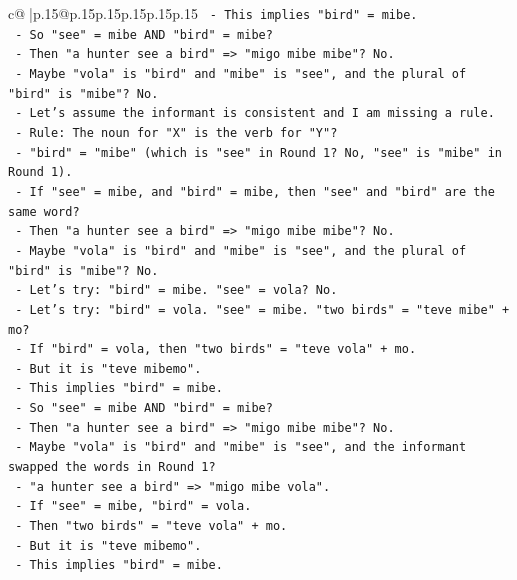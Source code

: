\documentclass{article}
\begin{document}
{\begin{supertabular}{c@{$\;$}|p{.15\linewidth}@{}p{.15\linewidth}p{.15\linewidth}p{.15\linewidth}p{.15\linewidth}p{.15\linewidth}}
{{{\texttt{        {-} This implies "bird" = mibe.} \\
\texttt{        {-} So "see" = mibe AND "bird" = mibe?} \\
\texttt{        {-} Then "a hunter see a bird" => "migo mibe mibe"? No.} \\
\texttt{        {-} Maybe "vola" is "bird" and "mibe" is "see", and the plural of "bird" is "mibe"? No.} \\
\texttt{        {-} Let's assume the informant is consistent and I am missing a rule.} \\
\texttt{        {-} Rule: The noun for "X" is the verb for "Y"?} \\
\texttt{          {-} "bird" = "mibe" (which is "see" in Round 1? No, "see" is "mibe" in Round 1).} \\
\texttt{          {-} If "see" = mibe, and "bird" = mibe, then "see" and "bird" are the same word?} \\
\texttt{          {-} Then "a hunter see a bird" => "migo mibe mibe"? No.} \\
\texttt{          {-} Maybe "vola" is "bird" and "mibe" is "see", and the plural of "bird" is "mibe"? No.} \\
\texttt{          {-} Let's try: "bird" = mibe. "see" = vola? No.} \\
\texttt{          {-} Let's try: "bird" = vola. "see" = mibe. "two birds" = "teve mibe" + mo?} \\
\texttt{          {-} If "bird" = vola, then "two birds" = "teve vola" + mo.} \\
\texttt{          {-} But it is "teve mibemo".} \\
\texttt{          {-} This implies "bird" = mibe.} \\
\texttt{          {-} So "see" = mibe AND "bird" = mibe?} \\
\texttt{          {-} Then "a hunter see a bird" => "migo mibe mibe"? No.} \\
\texttt{          {-} Maybe "vola" is "bird" and "mibe" is "see", and the informant swapped the words in Round 1?} \\
\texttt{          {-} "a hunter see a bird" => "migo mibe vola".} \\
\texttt{          {-} If "see" = mibe, "bird" = vola.} \\
\texttt{          {-} Then "two birds" = "teve vola" + mo.} \\
\texttt{          {-} But it is "teve mibemo".} \\
\texttt{          {-} This implies "bird" = mibe.} \\
}}}
\end{supertabular}}
\end{document}
